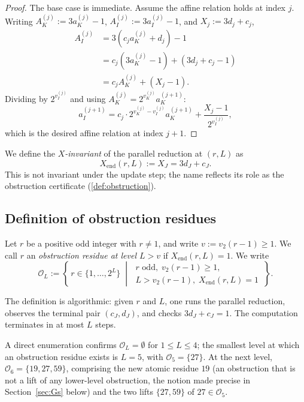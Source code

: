 \documentclass[11pt,reqno]{amsart}
\newcommand{\Obs}{\mathcal{O}}
\newcommand{\Xend}{X_{\mathrm{end}}}
\newcommand{\vk}{v_{K}}
\newcommand{\vi}{v_{I}}
\newcommand{\vtwo}{v_{2}}
\begin{document}
\begin{proof}
The base case is immediate. Assume the affine relation holds at index $j$.
Writing $A_K^{(j)} := 3 a_K^{(j)} - 1$, $A_I^{(j)} := 3 a_I^{(j)} - 1$, and
$X_j := 3 d_j + c_j$,
\begin{align*}
A_I^{(j)} &= 3(c_j a_K^{(j)} + d_j) - 1 \\
   &= c_j (3 a_K^{(j)} - 1) + (3 d_j + c_j - 1) \\
   &= c_j A_K^{(j)} + (X_j - 1).
\end{align*}
Dividing by $2^{\vi^{(j)}}$ and using $A_K^{(j)} = 2^{\vk^{(j)}} a_K^{(j+1)}$:
\[
a_I^{(j+1)} = c_j \cdot 2^{\vk^{(j)} - \vi^{(j)}} a_K^{(j+1)} + \frac{X_j - 1}{2^{\vi^{(j)}}},
\]
which is the desired affine relation at index $j+1$. \qedhere
\end{proof}

We define the \emph{$X$-invariant} of the parallel reduction at $(r, L)$ as
\[
\Xend(r, L) := X_J = 3 d_J + c_J.
\]
This is not invariant under the update step; the name reflects its role
as the obstruction certificate (\cref{def:obstruction}).

\subsection{Definition of obstruction residues}

\begin{definition}
\label{def:obstruction}
Let $r$ be a positive odd integer with $r \ne 1$, and write
$v := \vtwo(r-1) \ge 1$. We
call $r$ an \emph{obstruction residue at level $L > v$} if $\Xend(r, L) = 1$.
We write
\[
\Obs_L := \left\{\, r \in \{1, \ldots, 2^L\}
  \;\middle|\;
  \begin{array}{l}
  r \text{ odd},\; \vtwo(r-1) \ge 1, \\
  L > \vtwo(r-1),\; \Xend(r, L) = 1
  \end{array}
\,\right\}.
\]
\end{definition}

The definition is algorithmic: given $r$ and $L$, one runs the parallel
reduction, observes the terminal pair $(c_J, d_J)$, and checks
$3 d_J + c_J = 1$. The computation terminates in at most $L$ steps.

\begin{remark}\label{rem:smallest-level}
A direct enumeration confirms $\Obs_L = \emptyset$ for $1 \le L \le 4$;
the smallest level at which an obstruction residue exists is $L = 5$,
with $\Obs_5 = \{27\}$. At the next level,
$\Obs_6 = \{19, 27, 59\}$, comprising the new atomic residue $19$
(an obstruction that is not a lift of any lower-level obstruction, the notion
made precise in Section~\ref{sec:Gs} below) and the two lifts
$\{27, 59\}$ of $27 \in \Obs_5$.
\end{remark}
\end{document}
